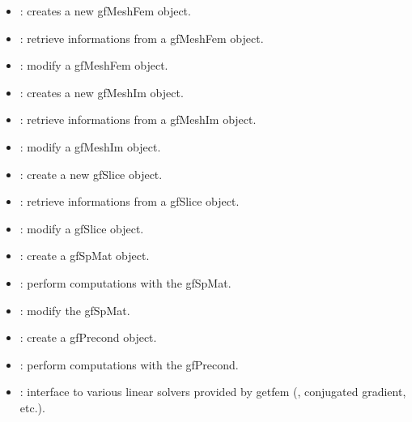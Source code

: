 \documentclass[a4paper,11pt,english]{sphinxmanual}
\begin{document}
\begin{itemize}
\item {} 
 : creates a new gfMeshFem object.

\item {} 
 : retrieve informations from a gfMeshFem object.

\item {} 
 : modify a gfMeshFem object.

\item {} 
 : creates a new gfMeshIm object.

\item {} 
 : retrieve informations from a gfMeshIm object.

\item {} 
 : modify a gfMeshIm object.

\item {} 
 : create a new gfSlice object.

\item {} 
 : retrieve informations from a gfSlice object.

\item {} 
 : modify a gfSlice object.

\item {} 
 : create a gfSpMat object.

\item {} 
 : perform computations with the gfSpMat.

\item {} 
 : modify the gfSpMat.

\item {} 
 : create a gfPrecond object.

\item {} 
 : perform computations with the gfPrecond.

\item {} 
 : interface to various linear solvers provided by getfem
(, conjugated gradient, etc.).


\end{itemize}
\end{document}
